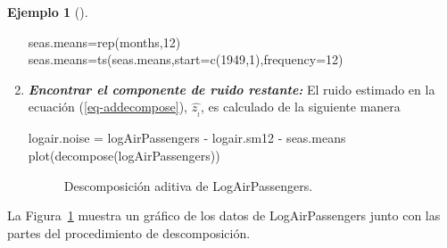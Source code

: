 \documentclass[
  us-letterpaper,
]{scrreprt}
\newenvironment{Shaded}{\begin{snugshade}}{\end{snugshade}}
\newcommand{\AttributeTok}[1]{\textcolor[rgb]{0.40,0.45,0.13}{#1}}
\newcommand{\DecValTok}[1]{\textcolor[rgb]{0.68,0.00,0.00}{#1}}
\newcommand{\FunctionTok}[1]{\textcolor[rgb]{0.28,0.35,0.67}{#1}}
\newcommand{\NormalTok}[1]{\textcolor[rgb]{0.00,0.23,0.31}{#1}}
\newcommand{\OtherTok}[1]{\textcolor[rgb]{0.00,0.23,0.31}{#1}}
\newcommand{\SpecialCharTok}[1]{\textcolor[rgb]{0.37,0.37,0.37}{#1}}
\theoremstyle{plain}
\theoremstyle{definition}
\theoremstyle{definition}
\newtheorem{example}{Ejemplo}[chapter]
\theoremstyle{plain}
\theoremstyle{remark}
\begin{document}
\begin{example}[]
\begin{tcolorbox}
\begin{enumerate}
\begin{Shaded}
\begin{Highlighting}[]
\NormalTok{seas.means}\OtherTok{=}\FunctionTok{rep}\NormalTok{(months,}\DecValTok{12}\NormalTok{)}
\NormalTok{seas.means}\OtherTok{=}\FunctionTok{ts}\NormalTok{(seas.means,}\AttributeTok{start=}\FunctionTok{c}\NormalTok{(}\DecValTok{1949}\NormalTok{,}\DecValTok{1}\NormalTok{),}\AttributeTok{frequency=}\DecValTok{12}\NormalTok{)}
\end{Highlighting}
\end{Shaded}
\item
  \textbf{\emph{Encontrar el componente de ruido restante:}} El ruido
  estimado en la ecuación (\ref{eq-addecompose}), \(\hat{z_{_t}}\), es
  calculado de la siguiente manera

\begin{Shaded}
\begin{Highlighting}[]
\NormalTok{logair.noise }\OtherTok{=}\NormalTok{ logAirPassengers }\SpecialCharTok{{-}}\NormalTok{ logair.sm12 }\SpecialCharTok{{-}}\NormalTok{ seas.means}
\FunctionTok{plot}\NormalTok{(}\FunctionTok{decompose}\NormalTok{(logAirPassengers))}
\end{Highlighting}
\end{Shaded}

  \begin{figure}[H]


  \caption{\label{fig-descadd}Descomposición aditiva de
  LogAirPassengers.}

  \end{figure}%
\end{enumerate}

La Figura~\ref{fig-descadd} muestra un gráfico de los datos de
LogAirPassengers junto con las partes del procedimiento de
descomposición.

\end{tcolorbox}

\end{example}
\end{document}

